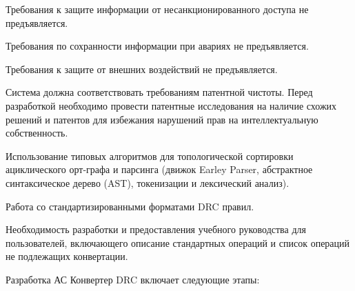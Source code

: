 
Требования к защите информации от несанкционированного доступа
не предъявляется.


Требования по сохранности информации при авариях не предъявляется.


Требования к защите от внешних воздействий не предъявляется.


Система должна соответствовать требованиям патентной чистоты.
Перед разработкой необходимо провести патентные исследования
на наличие схожих решений и патентов
для избежания нарушений прав на интеллектуальную собственность.


Использование типовых алгоритмов
для топологической сортировки ациклического орт-графа и парсинга
(движок Earley Parser, абстрактное синтаксическое дерево (AST),
токенизации и лексический анализ).

Работа со стандартизированными форматами DRC правил.


Необходимость разработки и предоставления учебного руководства
для пользователей, включающего описание стандартных операций
и список операций не подлежащих конвертации.


Разработка АС Конвертер DRC включает следующие этапы:

